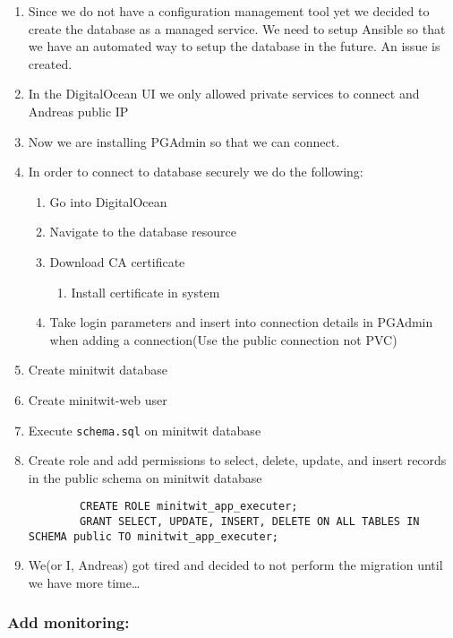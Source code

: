 \begin{enumerate}
    \item Since we do not have a configuration management tool yet we decided to create the database as a managed service. We need to setup Ansible so that we have an automated way to setup the database in the future. An issue is created.
    \item In the DigitalOcean UI we only allowed private services to connect and Andreas public IP
    \item Now we are installing PGAdmin so that we can connect.
    \item In order to connect to database securely we do the following:

    \begin{enumerate}
        \item Go into DigitalOcean
        \item Navigate to the database resource
        \item Download CA certificate
        \begin{enumerate}
            \item Install certificate in system
        \end{enumerate}

        \item Take login parameters and insert into connection details in PGAdmin when adding a connection(Use the public connection not PVC)
    \end{enumerate}
    \item Create minitwit database
    \item Create minitwit-web user
    \item Execute \texttt{schema.sql} on minitwit database
    \item Create role and add permissions to select, delete, update, and insert records in the public schema on minitwit database

    \begin{verbatim}
        CREATE ROLE minitwit_app_executer;
        GRANT SELECT, UPDATE, INSERT, DELETE ON ALL TABLES IN SCHEMA public TO minitwit_app_executer;
    \end{verbatim}
    \item We(or I, Andreas) got tired and decided to not perform the migration until we have more time\ldots{}
\end{enumerate}

\subsubsection{Add monitoring:}
\label{log:add-monitoring}

